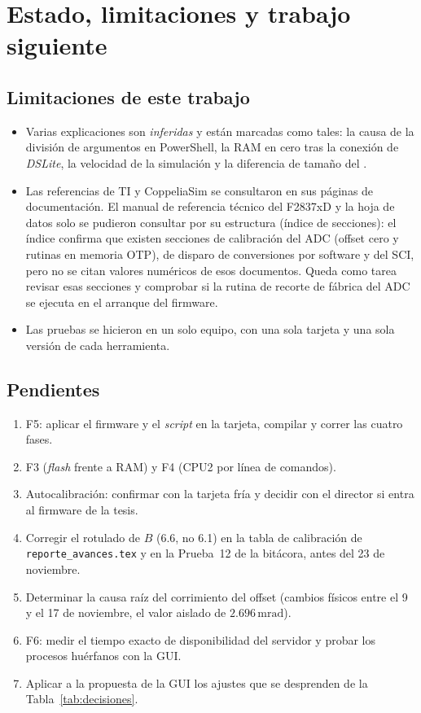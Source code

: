 \documentclass[12pt,letterpaper]{article}
\newcommand{\cod}[1]{\texttt{\detokenize{#1}}}
\newcommand{\mrad}{\,\mathrm{mrad}}
\begin{document}
\section{Estado, limitaciones y trabajo siguiente}
\label{sec:estado}

\subsection{Limitaciones de este trabajo}

\begin{itemize}
    \item Varias explicaciones son \textit{inferidas} y están marcadas como tales: la causa de la división de argumentos en PowerShell, la RAM en cero tras la conexión de \textit{DSLite}, la velocidad de la simulación y la diferencia de tamaño del \cod{.out}.
    \item Las referencias de TI y CoppeliaSim se consultaron en sus páginas de documentación. El manual de referencia técnico del F2837xD \cite{trm} y la hoja de datos solo se pudieron consultar por su estructura (índice de secciones): el índice confirma que existen secciones de calibración del ADC (offset cero y rutinas en memoria OTP), de disparo de conversiones por software y del SCI, pero no se citan valores numéricos de esos documentos. Queda como tarea revisar esas secciones y comprobar si la rutina de recorte de fábrica del ADC se ejecuta en el arranque del firmware.
    \item Las pruebas se hicieron en un solo equipo, con una sola tarjeta y una sola versión de cada herramienta.
\end{itemize}

\subsection{Pendientes}

\begin{enumerate}
    \item F5: aplicar el firmware y el \textit{script} en la tarjeta, compilar y correr las cuatro fases.
    \item F3 (\textit{flash} frente a RAM) y F4 (CPU2 por línea de comandos).
    \item Autocalibración: confirmar con la tarjeta fría y decidir con el director si entra al firmware de la tesis.
    \item Corregir el rotulado de $B$ (6.6, no 6.1) en la tabla de calibración de \texttt{reporte\_\allowbreak avances.tex} y en la Prueba~12 de la bitácora, antes del 23 de noviembre.
    \item Determinar la causa raíz del corrimiento del offset (cambios físicos entre el 9 y el 17 de noviembre, el valor aislado de $2.696\mrad$).
    \item F6: medir el tiempo exacto de disponibilidad del servidor y probar los procesos huérfanos con la GUI.
    \item Aplicar a la propuesta de la GUI los ajustes que se desprenden de la Tabla~\ref{tab:decisiones}.
\end{enumerate}
\end{document}

